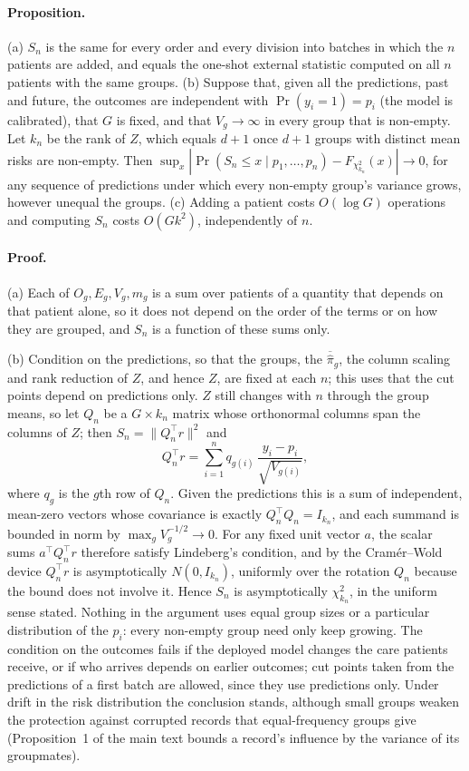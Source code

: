 \documentclass[11pt]{article}
\newcommand{\pibar}{\overline{\hat{\pi}}}
\begin{document}
\paragraph{Proposition.} (a) $S_n$ is the same for every order and every division into batches in
which the $n$ patients are added, and equals the one-shot external statistic computed on all $n$
patients with the same groups. (b) Suppose that, given all the predictions, past and future, the outcomes
are independent with $\Pr(y_i=1)=p_i$ (the model is calibrated), that $G$ is fixed, and that
$V_g\to\infty$ in every group that is non-empty. Let $k_n$ be the rank of $Z$, which equals $d+1$ once
$d+1$ groups with distinct mean risks are non-empty. Then
$\sup_x|\Pr(S_n\le x\mid p_1,\dots,p_n)-F_{\chi^2_{k_n}}(x)|\to0$, for any sequence of predictions under
which every non-empty group's variance grows, however unequal the groups. (c) Adding a patient costs
$O(\log G)$ operations and computing $S_n$ costs $O(Gk^2)$, independently of $n$.

\paragraph{Proof.} (a) Each of $O_g,E_g,V_g,m_g$ is a sum over patients of a quantity that depends on
that patient alone, so it does not depend on the order of the terms or on how they are grouped, and
$S_n$ is a function of these sums only.

(b) Condition on the predictions, so that the groups, the $\pibar_g$, the column scaling and rank
reduction of $Z$, and hence $Z$, are fixed at each $n$; this uses that the cut points depend on
predictions only. $Z$ still changes with $n$ through the group means, so let $Q_n$ be a $G\times k_n$
matrix whose orthonormal columns span the columns of $Z$; then $S_n=\lVert Q_n^\top r\rVert^2$ and
\[
Q_n^\top r=\sum_{i=1}^n q_{g(i)}\,\frac{y_i-p_i}{\sqrt{V_{g(i)}}},
\]
where $q_g$ is the $g$th row of $Q_n$. Given the predictions this is a sum of independent, mean-zero
vectors whose covariance is exactly $Q_n^\top Q_n=I_{k_n}$, and each summand is bounded in norm by
$\max_g V_g^{-1/2}\to0$. For any fixed unit vector $a$, the scalar sums $a^\top Q_n^\top r$ therefore
satisfy Lindeberg's condition, and by the Cram\'er--Wold device $Q_n^\top r$ is asymptotically
$N(0,I_{k_n})$, uniformly over the rotation $Q_n$ because the bound does not involve it. Hence $S_n$ is
asymptotically $\chi^2_{k_n}$, in the uniform sense stated. Nothing in the argument uses equal group sizes
or a particular distribution of the $p_i$: every non-empty group need only keep growing. The condition
on the outcomes fails if the deployed model changes the care patients receive, or if who arrives
depends on earlier outcomes; cut points taken from the predictions of a first batch are allowed, since
they use predictions only. Under drift in the risk distribution the conclusion stands, although small groups weaken
the protection against corrupted records that equal-frequency groups give (Proposition~1 of the main
text bounds a record's influence by the variance of its groupmates).
\end{document}
